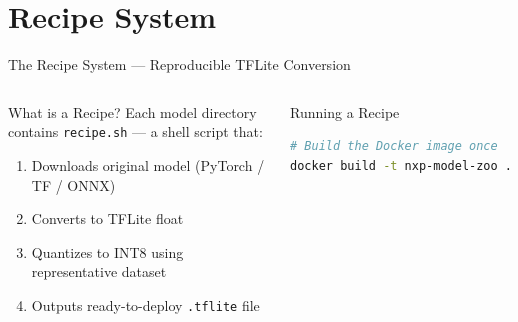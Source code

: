 \documentclass[aspectratio=169]{beamer}
\begin{document}
\section{Recipe System}

\begin{frame}[fragile]{The Recipe System — Reproducible TFLite Conversion}
  \begin{columns}[T]
      \begin{block}{What is a Recipe?}
        Each model directory contains \texttt{recipe.sh} — a shell script that:
        \begin{enumerate}\scriptsize
          \item Downloads original model (PyTorch / TF / ONNX)
          \item Converts to TFLite float
          \item Quantizes to \alert{INT8} using representative dataset
          \item Outputs ready-to-deploy \texttt{.tflite} file
        \end{enumerate}
      \end{block}
      \vspace{6pt}
      \begin{block}{Running a Recipe}
        \begin{lstlisting}[language=bash]
# Build the Docker image once
docker build -t nxp-model-zoo .


\end{lstlisting}
\end{block}
\end{columns}
\end{frame}
\end{document}

